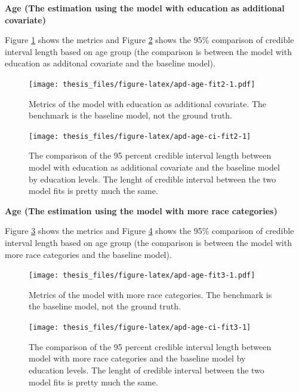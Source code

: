 \documentclass{monashthesis}
\begin{document}
\newpage

\textbf{Age (The estimation using the model with education as additional covariate)}

Figure \ref{fig:apd-age-fit2} shows the metrics and Figure \ref{fig:apd-age-ci-fit2} shows the 95\% comparison of credible interval length based on age group (the comparison is between the model with education as additonal covariate and the baseline model).

\begin{figure}
\centering
\texttt{[image: thesis\_files/figure-latex/apd-age-fit2-1.pdf]}
\caption{\label{fig:apd-age-fit2}Metrics of the model with education as additional covariate. The benchmark is the baseline model, not the ground truth.}
\end{figure}

\begin{figure}
\texttt{[image: thesis\_files/figure-latex/apd-age-ci-fit2-1]} \caption{The comparison of the 95 percent credible interval length between model with education as additional covariate and the baseline model by education levels. The lenght of credible interval between the two model fits is pretty much the same.}\label{fig:apd-age-ci-fit2}
\end{figure}

\newpage

\textbf{Age (The estimation using the model with more race categories)}

Figure \ref{fig:apd-age-fit3} shows the metrics and Figure \ref{fig:apd-age-ci-fit3} shows the 95\% comparison of credible interval length based on age group (the comparison is between the model with more race categories and the baseline model).

\begin{figure}
\centering
\texttt{[image: thesis\_files/figure-latex/apd-age-fit3-1.pdf]}
\caption{\label{fig:apd-age-fit3}Metrics of the model with more race categories. The benchmark is the baseline model, not the ground truth.}
\end{figure}

\begin{figure}
\texttt{[image: thesis\_files/figure-latex/apd-age-ci-fit3-1]} \caption{The comparison of the 95 percent credible interval length between model with more race categories and the baseline model by education levels. The lenght of credible interval between the two model fits is pretty much the same.}\label{fig:apd-age-ci-fit3}
\end{figure}

\printbibliography[heading=bibintoc]
\end{document}
